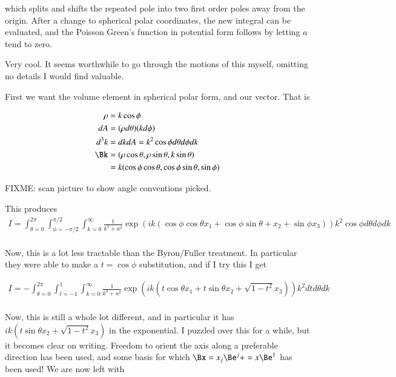 which splits and shifts the repeated pole into two first order poles away from the origin.
After a change to spherical polar coordinates, the new integral can be evaluated, and the Poisson Green's function in potential form follows by
letting $a$ tend to zero.

Very cool.  It seems worthwhile to go through the motions of this myself, omitting no details I would find valuable.

First we want the volume element in spherical polar form, and our vector.  That is

\begin{align*}
\rho &= k \cos\phi \\
dA &= (\rho d\theta)(k d\phi) \\
d^3 k &= dk dA = k^2 \cos\phi d\theta d\phi dk \\
\Bk
&= (\rho \cos\theta, \rho \sin\theta, k \sin\theta) \\
&= k (\cos\phi \cos\theta, \cos\phi \sin\theta, \sin\phi) \\
\end{align*}

FIXME: scan picture to show angle conventions picked.

This produces
\begin{align*}
I = \int_{\theta=0}^{2\pi} \int_{\phi=-\pi/2}^{\pi/2} \int_{k=0}^\infty \frac{1}{k^2 + a^2} \exp\left( i k (\cos\phi \cos\theta x_1 + \cos\phi \sin\theta + x_2 + \sin\phi x_3) \right)
k^2 \cos\phi d\theta d\phi dk \\
\end{align*}

Now, this is a lot less tractable than the Byron/Fuller treatment.  In particular they were able to make a $t = \cos\phi$ substitution, and if I try this I get

\begin{align*}
I = -\int_{\theta=0}^{2\pi} \int_{t=-1}^{1} \int_{k=0}^\infty \frac{1}{k^2 + a^2} \exp\left( i k (t \cos\theta x_1 + t \sin\theta x_2 + \sqrt{1-t^2} x_3) \right)
k^2 dt d\theta dk \\
\end{align*}

Now, this is still a whole lot different, and in particular it has $ik (t\sin\theta x_2 + \sqrt{1-t^2} x_3)$ in the exponential.  I puzzled over this for a while, but it becomes clear on writing.  Freedom to orient the axis along a preferable direction has been used, and some basis for which $\Bx = x_j \Be^j + = x \Be^1$ has been used!  We are now left with

